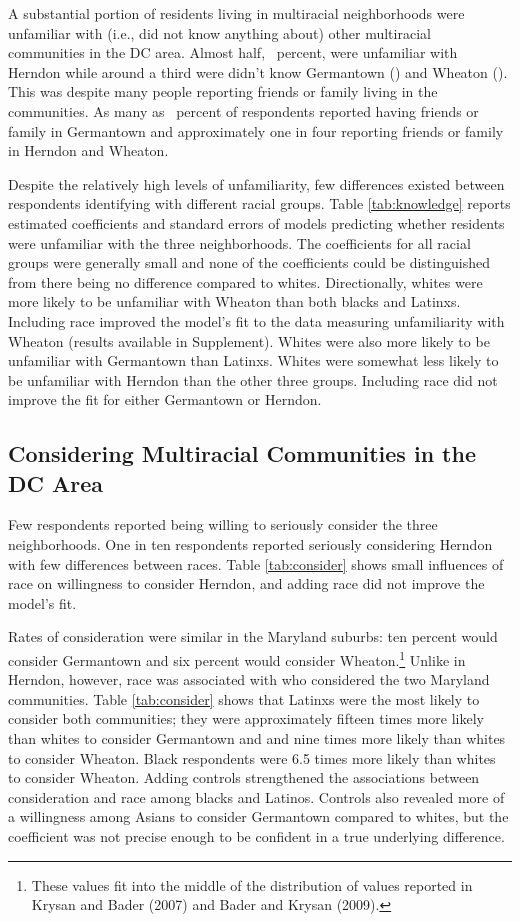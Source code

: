 \documentclass{baderart}
\begin{document}
A substantial portion of residents living in multiracial neighborhoods were unfamiliar with (i.e., did not know anything about) other multiracial communities in the DC area. Almost half, \dkherndon~percent, were unfamiliar with Herndon while around a third were didn't know Germantown (\dkgermantown) and Wheaton (\dkwheaton). This was despite many people reporting friends or family living in the communities. As many as \ffgermantown~percent of respondents reported having friends or family in Germantown and approximately one in four reporting friends or family in Herndon and Wheaton.

Despite the relatively high levels of unfamiliarity, few differences existed between respondents identifying with different racial groups. Table \ref{tab:knowledge} reports estimated coefficients and standard errors of models predicting whether residents were unfamiliar with the three neighborhoods. The coefficients for all racial groups were generally small and none of the coefficients could be distinguished from there being no difference compared to whites. Directionally, whites were more likely to be unfamiliar with Wheaton than both blacks and Latinxs. Including race improved the model's fit to the data measuring unfamiliarity with Wheaton (results available in Supplement). Whites were also more likely to be unfamiliar with Germantown than Latinxs. Whites were somewhat less likely to be unfamiliar with Herndon than the other three groups. Including race did not improve the fit for either Germantown or Herndon. 


\subsection{Considering Multiracial Communities in the DC Area}
Few respondents reported being willing to seriously consider the three neighborhoods. One in ten respondents reported seriously considering Herndon with few differences between races. Table \ref{tab:consider} shows small influences of race on willingness to consider Herndon, and adding race did not improve the model's fit. 


Rates of consideration were similar in the Maryland suburbs: ten percent would consider Germantown and six percent would consider Wheaton.\footnote{These values fit into the middle of the distribution of values reported in Krysan and Bader (2007) and Bader and Krysan (2009).} Unlike in Herndon, however, race was associated with who considered the two Maryland communities. Table \ref{tab:consider} shows that Latinxs were the most likely to consider both communities; they were approximately fifteen times more likely than whites to consider Germantown and and nine times more likely than whites to consider Wheaton. Black respondents were 6.5 times more likely than whites to consider Wheaton. Adding controls strengthened the associations between consideration and race among blacks and Latinos. Controls also revealed more of a willingness among Asians to consider Germantown compared to whites, but the coefficient was not precise enough to be confident in a true underlying difference. 
\end{document}
